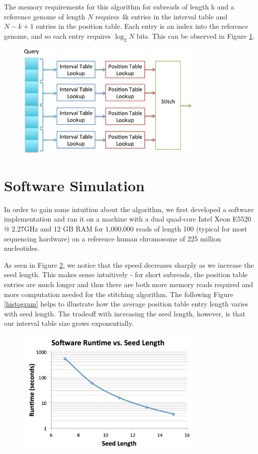 \documentclass[11pt]{article}
\begin{document}
The memory requirements for this algorithm for subreads of length k and a reference genome of length $N$ requires 4k entries in the interval table and $N-k+1$ entries in the position table. Each entry is an index into the reference genome, and so each entry requires $\log_2 N$ bits.  This can be observed in Figure \ref{archprocess}.
\begin{figure}[ht!]
\centering
\includegraphics[width=90mm]{archprocess.png}
\caption{}
\label{archprocess}
\end{figure}


\section{Software Simulation}

In order to gain some intuition about the algorithm, we first developed a software implementation and ran it on a machine with a dual quad-core Intel Xeon E5520 @ 2.27GHz and 12 GB RAM for 1,000,000 reads of length 100 (typical for most sequencing hardware) on a reference human chromosome of 225 million nucleotides.


As seen in Figure \ref{speedvsseedlen}, we notice that the speed decreases sharply as we increase the seed length. This makes sense intuitively - for short subreads, the position table entries are much longer and thus there are both more memory reads required and more computation needed for the stitching algorithm. The following Figure \ref{histogram} helps to illustrate how the average position table entry length varies with seed length. The tradeoff with increasing the seed length, however, is that our interval table size grows exponentially.
\begin{figure}[ht!]
\centering
\includegraphics[width=90mm]{swruntime.png}
\caption{}
\label{speedvsseedlen}
\end{figure}
\end{document}
